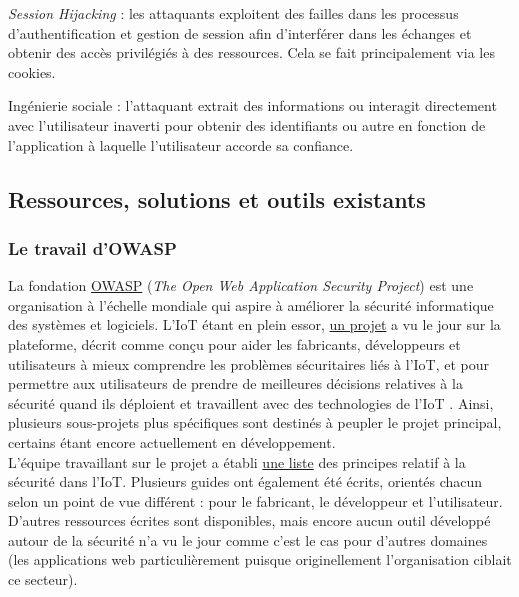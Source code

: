 \documentclass[]{article}
\begin{document}
\par \textit{Session Hijacking} : les attaquants exploitent des failles dans les processus d'authentification et gestion de session afin d'interférer dans les échanges et obtenir des accès privilégiés à des ressources. Cela se fait principalement via les cookies.\\

\par Ingénierie sociale : l'attaquant extrait des informations ou interagit directement avec l'utilisateur inaverti pour obtenir des identifiants ou autre en fonction de l'application à laquelle l'utilisateur accorde sa confiance.

\newpage


\subsection{Ressources, solutions et outils existants}
\label{scanners}

\subsubsection{Le travail d'OWASP}

La fondation \href{https://www.owasp.org/index.php/Main_Page}{OWASP} (\textit{The Open Web Application Security Project}) est une organisation à l'échelle mondiale qui aspire à améliorer la sécurité informatique des systèmes et logiciels. L'IoT étant en plein essor, \href{https://www.owasp.org/index.php/OWASP_Internet_of_Things_Project}{un projet} a vu le jour sur la plateforme, décrit comme \og conçu pour aider les fabricants, développeurs et utilisateurs à mieux comprendre les problèmes sécuritaires liés à l'IoT, et pour permettre aux utilisateurs de prendre de meilleures décisions relatives à la sécurité quand ils déploient et travaillent avec des technologies de l'IoT \fg .
Ainsi, plusieurs sous-projets plus spécifiques sont destinés à peupler le projet principal, certains étant encore actuellement en développement.\\

L'équipe travaillant sur le projet a établi \href{https://www.owasp.org/index.php/Principles_of_IoT_Security}{une liste} des principes relatif à la sécurité dans l'IoT. Plusieurs guides ont également été écrits, orientés chacun selon un point de vue différent : pour le fabricant, le développeur et l'utilisateur. D'autres ressources écrites sont disponibles, mais encore aucun outil développé autour de la sécurité n'a vu le jour comme c'est le cas pour d'autres domaines (les applications web particulièrement puisque originellement l'organisation ciblait ce secteur).	 
\end{document}

